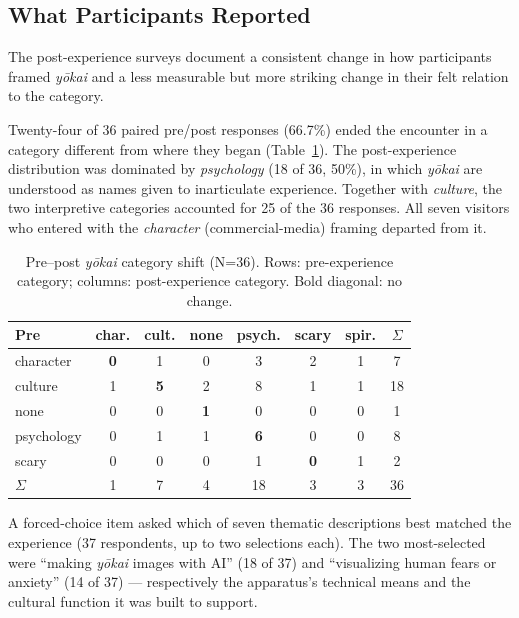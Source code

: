 \documentclass[manuscript,review,anonymous,nonacm]{acmart}
\begin{document}
\subsection{What Participants Reported}

The post-experience surveys document a consistent change in how participants framed \textit{y\=okai} and a less measurable but more striking change in their felt relation to the category.

Twenty-four of 36 paired pre/post responses (66.7\%) ended the encounter in a category different from where they began (Table~\ref{tab:shift}). The post-experience distribution was dominated by \textit{psychology} (18 of 36, 50\%), in which \textit{y\=okai} are understood as names given to inarticulate experience. Together with \textit{culture}, the two interpretive categories accounted for 25 of the 36 responses. All seven visitors who entered with the \textit{character} (commercial-media) framing departed from it.

\begin{table}[h]
\caption{Pre--post \textit{y\=okai} category shift (N=36). Rows: pre-experience category; columns: post-experience category. Bold diagonal: no change.}
\label{tab:shift}
\small
\begin{tabular}{p{1.6cm}cccccc|c}
\hline
\textbf{Pre} & \textbf{char.} & \textbf{cult.} & \textbf{none} & \textbf{psych.} & \textbf{scary} & \textbf{spir.} & \textbf{$\Sigma$} \\
\hline
character  & \textbf{0} & 1 & 0 & 3 & 2 & 1 & 7 \\
culture    & 1 & \textbf{5} & 2 & 8 & 1 & 1 & 18 \\
none       & 0 & 0 & \textbf{1} & 0 & 0 & 0 & 1 \\
psychology & 0 & 1 & 1 & \textbf{6} & 0 & 0 & 8 \\
scary      & 0 & 0 & 0 & 1 & \textbf{0} & 1 & 2 \\
\hline
$\Sigma$   & 1 & 7 & 4 & 18 & 3 & 3 & 36 \\
\hline
\end{tabular}
\end{table}

A forced-choice item asked which of seven thematic descriptions best matched the experience (37 respondents, up to two selections each). The two most-selected were ``making \textit{y\=okai} images with AI'' (18 of 37) and ``visualizing human fears or anxiety'' (14 of 37) — respectively the apparatus's technical means and the cultural function it was built to support.
\end{document}
